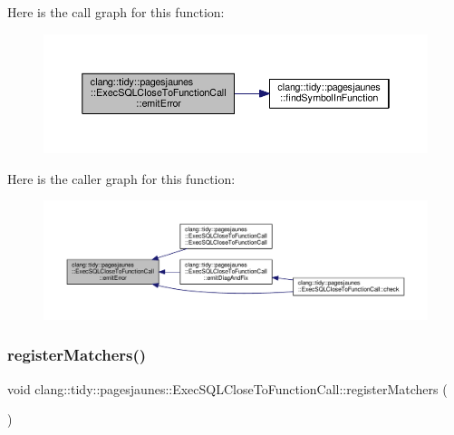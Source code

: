 Here is the call graph for this function\+:
\nopagebreak
\begin{figure}[H]
\begin{center}
\leavevmode
\includegraphics[width=350pt]{classclang_1_1tidy_1_1pagesjaunes_1_1_exec_s_q_l_close_to_function_call_a6cd603a678f16ede06a04049889bcf2a_cgraph}
\end{center}
\end{figure}
Here is the caller graph for this function\+:
\nopagebreak
\begin{figure}[H]
\begin{center}
\leavevmode
\includegraphics[width=350pt]{classclang_1_1tidy_1_1pagesjaunes_1_1_exec_s_q_l_close_to_function_call_a6cd603a678f16ede06a04049889bcf2a_icgraph}
\end{center}
\end{figure}
\mbox{\label{classclang_1_1tidy_1_1pagesjaunes_1_1_exec_s_q_l_close_to_function_call_a574828312647b46fa645609f41787d35}} 
\subsubsection{\texorpdfstring{register\+Matchers()}{registerMatchers()}}
{\footnotesize\ttfamily void clang\+::tidy\+::pagesjaunes\+::\+Exec\+S\+Q\+L\+Close\+To\+Function\+Call\+::register\+Matchers (\begin{DoxyParamCaption}\item[{ast\+\_\+matchers\+::\+Match\+Finder $\ast$}]{ }\end{DoxyParamCaption})\hspace{0.3cm}{\ttfamily [override]}}



